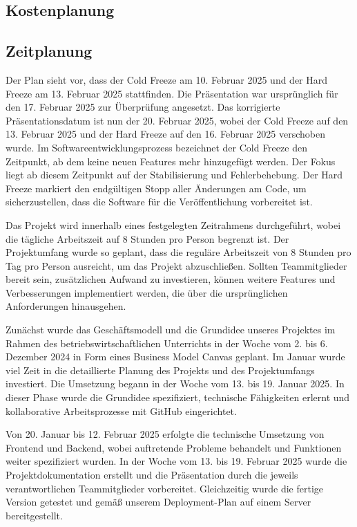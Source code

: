 \documentclass[a4paper,12pt]{article}
\begin{document}
\subsection{Kostenplanung}

\subsection{Zeitplanung}
Der Plan sieht vor, dass der Cold Freeze am 10. Februar 2025 und der Hard
Freeze am 13. Februar 2025 stattfinden. Die Präsentation war ursprünglich für
den 17. Februar 2025 zur Überprüfung angesetzt. Das korrigierte
Präsentationsdatum ist nun der 20. Februar 2025, wobei der Cold Freeze auf den
13. Februar 2025 und der Hard Freeze auf den 16. Februar 2025 verschoben wurde.
Im Softwareentwicklungsprozess bezeichnet der Cold Freeze den Zeitpunkt, ab dem
keine neuen Features mehr hinzugefügt werden. Der Fokus liegt ab diesem
Zeitpunkt auf der Stabilisierung und Fehlerbehebung. Der Hard Freeze markiert
den endgültigen Stopp aller Änderungen am Code, um sicherzustellen, dass die
Software für die Veröffentlichung vorbereitet ist.

Das Projekt wird innerhalb eines festgelegten Zeitrahmens durchgeführt, wobei
die tägliche Arbeitszeit auf 8 Stunden pro Person begrenzt ist. Der
Projektumfang wurde so geplant, dass die reguläre Arbeitszeit von 8 Stunden pro
Tag pro Person ausreicht, um das Projekt abzuschließen. Sollten Teammitglieder
bereit sein, zusätzlichen Aufwand zu investieren, können weitere Features und
Verbesserungen implementiert werden, die über die ursprünglichen Anforderungen
hinausgehen.

Zunächst wurde das Geschäftsmodell und die Grundidee unseres Projektes im
Rahmen des betriebswirtschaftlichen Unterrichts in der Woche vom 2. bis 6.
Dezember 2024 in Form eines Business Model Canvas geplant. Im Januar wurde viel
Zeit in die detaillierte Planung des Projekts und des Projektumfangs
investiert. Die Umsetzung begann in der Woche vom 13. bis 19. Januar 2025. In
dieser Phase wurde die Grundidee spezifiziert, technische Fähigkeiten erlernt
und kollaborative Arbeitsprozesse mit GitHub eingerichtet.

Von 20. Januar bis 12. Februar 2025 erfolgte die technische Umsetzung von
Frontend und Backend, wobei auftretende Probleme behandelt und Funktionen
weiter spezifiziert wurden. In der Woche vom 13. bis 19. Februar 2025 wurde die
Projektdokumentation erstellt und die Präsentation durch die jeweils
verantwortlichen Teammitglieder vorbereitet. Gleichzeitig wurde die fertige
Version getestet und gemäß unserem Deployment-Plan auf einem Server
bereitgestellt.
\end{document}
